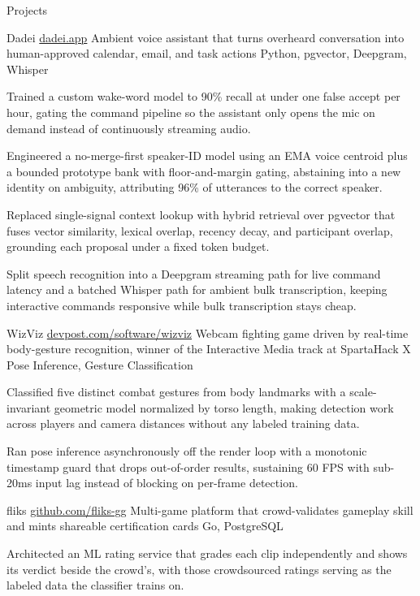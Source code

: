 \documentclass[
	11pt
]{../../../template}
\begin{document}
	\begin{rSection}{P}{rojects}
		\begin{rSectionEntry}
			{Dadei}
			{\href{https://dadei.app}{dadei.app}}
			{Ambient voice assistant that turns overheard conversation into human-approved calendar, email, and task actions}
			{Python, pgvector, Deepgram, Whisper}
			{}

			\item Trained a custom wake-word model to 90\% recall at under one false accept per hour, gating the command pipeline so the assistant only opens the mic on demand instead of continuously streaming audio.
			\item Engineered a no-merge-first speaker-ID model using an EMA voice centroid plus a bounded prototype bank with floor-and-margin gating, abstaining into a new identity on ambiguity, attributing 96\% of utterances to the correct speaker.
			\item Replaced single-signal context lookup with hybrid retrieval over pgvector that fuses vector similarity, lexical overlap, recency decay, and participant overlap, grounding each proposal under a fixed token budget.
			\item Split speech recognition into a Deepgram streaming path for live command latency and a batched Whisper path for ambient bulk transcription, keeping interactive commands responsive while bulk transcription stays cheap.
		\end{rSectionEntry}

		\begin{rSectionEntry}
			{WizViz}
			{\href{https://devpost.com/software/wizviz}{devpost.com/software/wizviz}}
			{Webcam fighting game driven by real-time body-gesture recognition, winner of the Interactive Media track at SpartaHack X}
			{Pose Inference, Gesture Classification}
			{}

			\item Classified five distinct combat gestures from body landmarks with a scale-invariant geometric model normalized by torso length, making detection work across players and camera distances without any labeled training data.
			\item Ran pose inference asynchronously off the render loop with a monotonic timestamp guard that drops out-of-order results, sustaining 60 FPS with sub-20ms input lag instead of blocking on per-frame detection.
		\end{rSectionEntry}

		\begin{rSectionEntry}
			{fliks}
			{\href{https://github.com/fliks-gg}{github.com/fliks-gg}}
			{Multi-game platform that crowd-validates gameplay skill and mints shareable certification cards}
			{Go, PostgreSQL}
			{}

			\item Architected an ML rating service that grades each clip independently and shows its verdict beside the crowd's, with those crowdsourced ratings serving as the labeled data the classifier trains on.
		\end{rSectionEntry}
	\end{rSection}
\end{document}
